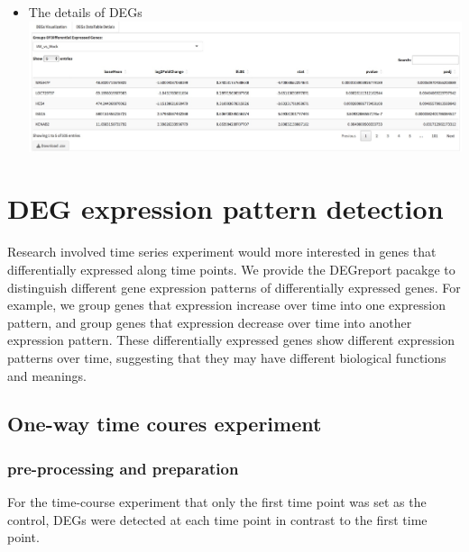 \documentclass[
  a4paper,
  oneside]{book}
\begin{document}
\begin{itemize}
\item
  The details of DEGs
  \includegraphics{images/dea-tab.jpeg}
\end{itemize}

\hypertarget{deg-expression-pattern-detection}{%
\chapter{DEG expression pattern detection}\label{deg-expression-pattern-detection}}

Research involved time series experiment would more interested in genes that differentially expressed along time points. We provide the DEGreport pacakge to distinguish different gene expression patterns of differentially expressed genes. For example, we group genes that expression increase over time into one expression pattern, and group genes that expression decrease over time into another expression pattern. These differentially expressed genes show different expression patterns over time, suggesting that they may have different biological functions and meanings.

\hypertarget{one-way-time-coures-experiment}{%
\section{One-way time coures experiment}\label{one-way-time-coures-experiment}}

\hypertarget{pre-processing-and-preparation}{%
\subsection{pre-processing and preparation}\label{pre-processing-and-preparation}}

For the time-course experiment that only the first time point was set as the control, DEGs were detected at each time point in contrast to the first time point.
\end{document}
